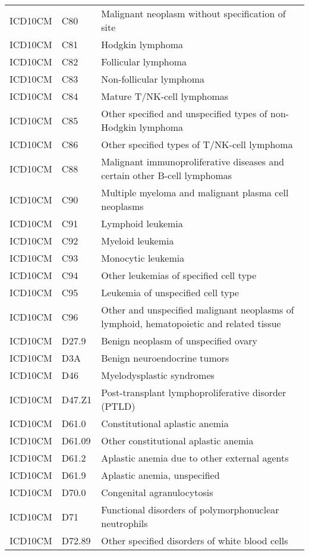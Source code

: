 \begin{table}[ht]
\begin{tabular}{lll}
  ICD10CM & C80 & Malignant neoplasm without specification of site \\ 
  ICD10CM & C81 & Hodgkin lymphoma \\ 
  ICD10CM & C82 & Follicular lymphoma \\ 
  ICD10CM & C83 & Non-follicular lymphoma \\ 
  ICD10CM & C84 & Mature T/NK-cell lymphomas \\ 
  ICD10CM & C85 & Other specified and unspecified types of non-Hodgkin lymphoma \\ 
  ICD10CM & C86 & Other specified types of T/NK-cell lymphoma \\ 
  ICD10CM & C88 & Malignant immunoproliferative diseases and certain other B-cell lymphomas \\ 
  ICD10CM & C90 & Multiple myeloma and malignant plasma cell neoplasms \\ 
  ICD10CM & C91 & Lymphoid leukemia \\ 
  ICD10CM & C92 & Myeloid leukemia \\ 
  ICD10CM & C93 & Monocytic leukemia \\ 
  ICD10CM & C94 & Other leukemias of specified cell type \\ 
  ICD10CM & C95 & Leukemia of unspecified cell type \\ 
  ICD10CM & C96 & Other and unspecified malignant neoplasms of lymphoid, hematopoietic and related tissue \\ 
  ICD10CM & D27.9 & Benign neoplasm of unspecified ovary \\ 
  ICD10CM & D3A & Benign neuroendocrine tumors \\ 
  ICD10CM & D46 & Myelodysplastic syndromes \\ 
  ICD10CM & D47.Z1 & Post-transplant lymphoproliferative disorder (PTLD) \\ 
  ICD10CM & D61.0 & Constitutional aplastic anemia \\ 
  ICD10CM & D61.09 & Other constitutional aplastic anemia \\ 
  ICD10CM & D61.2 & Aplastic anemia due to other external agents \\ 
  ICD10CM & D61.9 & Aplastic anemia, unspecified \\ 
  ICD10CM & D70.0 & Congenital agranulocytosis \\ 
  ICD10CM & D71 & Functional disorders of polymorphonuclear neutrophils \\ 
  ICD10CM & D72.89 & Other specified disorders of white blood cells \\ 

\end{tabular}
\end{table}
